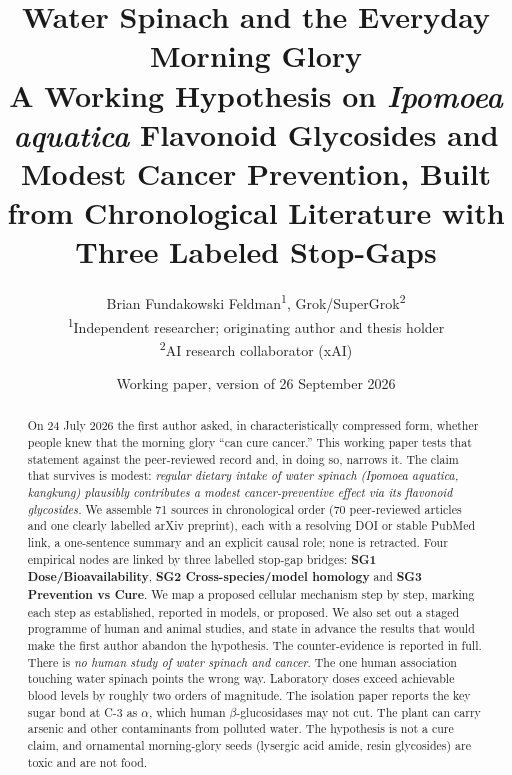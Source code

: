 \documentclass[11pt,a4paper]{article}
\title{\color{navy}\textbf{Water Spinach and the Everyday Morning Glory}\\[4pt]
\large\color{teal}A Working Hypothesis on \emph{Ipomoea aquatica} Flavonoid Glycosides and Modest Cancer Prevention, Built from Chronological Literature with Three Labeled Stop-Gaps}
\author{Brian Fundakowski Feldman\textsuperscript{1}, \quad Grok/SuperGrok\textsuperscript{2}\\[4pt]
\small\textsuperscript{1}Independent researcher; originating author and thesis holder\\
\small\textsuperscript{2}AI research collaborator (xAI)}
\date{Working paper, version of 26 September 2026}
\begin{document}
\nocite{bjeldanes1977,alphatocopherolbetac1994,hollman1995,omenn1996,woo1997,day1998,kasturi1998,day2000,braune2001,graczyk2001,gothberg2002,knekt2002,berrin2003,day2003,malalavidhane2003,nemeth2003,hernandez2004,kroon2004,thu2004,manach2005,prasad2005,prasad2005b,cao2007,jin2007,kottra2007,lee2007,neufert2007,vuong2007,bobe2008,egert2008,luo2008,marcussen2008,takachi2008,wang2009,murota2010,karna2011,klein2011,bjelakovic2012,jin2012,meira2012,oi2012,zheng2012,deng2013,juszczak2013,akhmetzhanov2014,fan2014,cincin2015,manigandan2015,lawal2016,yang2016,aune2017,grosso2017,hashemzaei2017,hefnygad2018,bondonno2019,sunil2019,hisaka2020,perciedusert2020,shi2020,wang2020,hsieh2021,papadimitriou2021,thang2021,sasikala2022,toy2022,saikia2023,ramos2024,wei2024,parmenter2025,huang2026,wu2026}

\maketitle

\begin{abstract}
\noindent On 24 July 2026 the first author asked, in characteristically compressed form, whether people knew that the morning glory ``can cure cancer.'' This working paper tests that statement against the peer-reviewed record and, in doing so, narrows it. The claim that survives is modest: \emph{regular dietary intake of water spinach (\emph{Ipomoea aquatica}, kangkung) plausibly contributes a modest cancer-preventive effect via its flavonoid glycosides.} We assemble 71 sources in chronological order (70 peer-reviewed articles and one clearly labelled arXiv preprint), each with a resolving DOI or stable PubMed link, a one-sentence summary and an explicit causal role; none is retracted. Four empirical nodes are linked by three labelled stop-gap bridges: \textbf{SG1 Dose/Bioavailability}, \textbf{SG2 Cross-species/model homology} and \textbf{SG3 Prevention vs Cure}. We map a proposed cellular mechanism step by step, marking each step as established, reported in models, or proposed. We also set out a staged programme of human and animal studies, and state in advance the results that would make the first author abandon the hypothesis. The counter-evidence is reported in full. There is \emph{no human study of water spinach and cancer}. The one human association touching water spinach points the wrong way. Laboratory doses exceed achievable blood levels by roughly two orders of magnitude. The isolation paper reports the key sugar bond at C-3 as $\alpha$, which human $\beta$-glucosidases may not cut. The plant can carry arsenic and other contaminants from polluted water. The hypothesis is not a cure claim, and ornamental morning-glory seeds (lysergic acid amide, resin glycosides) are toxic and are not food.
\end{abstract}
\end{document}
